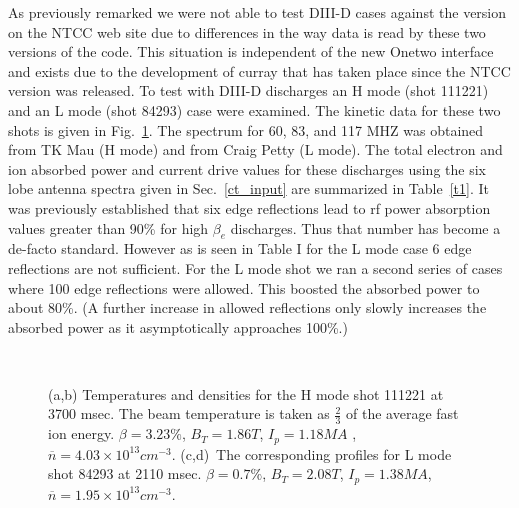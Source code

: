 As previously remarked we were not able to test DIII-D cases against
 the \ct version on the NTCC web site due to differences in the
 way \ot data is read by these two  versions of the code.
 This situation is independent of the new Onetwo interface and exists
 due to the development of curray that has taken place  since
 the NTCC version was released. To test \ct  with  DIII-D discharges an H mode
 (shot 111221) and an L mode (shot 84293) case were examined. The
 kinetic data for these two shots is given in Fig.~\ref{f1}. The 
 spectrum for 60, 83, and 117 MHZ was obtained from TK Mau (H mode)  and from
 Craig Petty (L mode). The total electron and ion absorbed power and
 current drive values for these discharges using the six lobe antenna
 spectra given in Sec.~\ref{ct_input} are summarized in Table~\ref{t1}. It was
 previously established \cite{b3} that six edge reflections lead to
 rf power absorption values greater than 90\% for high $\beta_e$
 discharges. Thus that number has become a de-facto standard. However as
 is seen in Table I for the L mode case 6 edge reflections are not
 sufficient. For the L mode shot we ran a second series of cases where
 100 edge reflections were allowed. This boosted the absorbed power to
 about 80\%. (A further increase in allowed reflections only slowly
increases the absorbed power as it asymptotically approaches 100\%.) 

 \begin{figure} %
 \centering 
\begin{narrow}{-.50in}{0in}   
 \mbox{}
\\[20pt]
 \mbox{}
\end{narrow}
 \caption{(a,b) Temperatures and densities for the H mode shot 111221
   at 3700 msec. The beam temperature is taken as $\frac{2}{3} $ of the
   average fast ion energy. $\beta = 3.23\%$, $B_T = 1.86 T$, $I_p = 1.18 MA$
   , $\overline{ n} = 4.03\times 10^{13} cm^{-3}$.
    (c,d)~The corresponding profiles for L mode shot 84293 at 2110
    msec. $\beta = 0.7\%$, $B_T = 2.08 T$, $I_p = 1.38 MA$, $\overline{ n} = 1.95 \times 10^{13} cm^{-3}$.}
  \label{f1}
 \end{figure}

